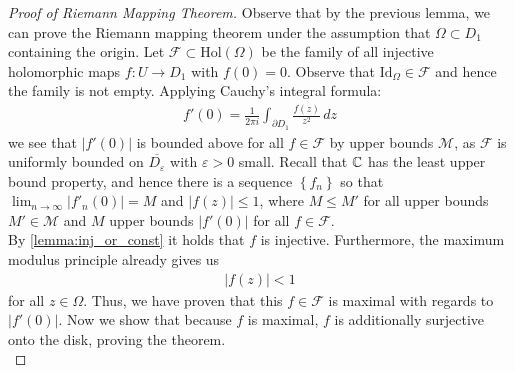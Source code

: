\documentclass{memoir}
\begin{document}
\begin{proof}[Proof of Riemann Mapping Theorem]
	Observe that by the previous lemma, we can prove the Riemann mapping theorem under the assumption that \(\Omega \subset D_1\) containing the origin. Let \(\mathcal{F}\subset \textrm{Hol}(\Omega )\) be the family of all injective holomorphic maps \(f:U\to D_1\) with \(f(0) = 0\). Observe that \(\textrm{Id}_\Omega \in \mathcal{F}\) and hence the family is not empty. Applying Cauchy's integral formula:
	\begin{align*}
		f'(0) = \frac{1}{2\pi i}\int_{\partial D_1} \frac{f(z)}{z^2}\,d z
	\end{align*}
	we see that \(\left| f'(0) \right| \) is bounded above for all \(f \in \mathcal{F}\) by upper bounds \(\mathcal{M}\), as \(\mathcal{F}\) is uniformly bounded on \(\overline{D_\varepsilon}\) with \(\varepsilon>0\) small. Recall that \(\mathbb{C}\) has the least upper bound property, and hence there is a sequence \(\left\{ f_n \right\} \) so that \(\lim_{n \to \infty} \left| f'_n(0) \right| = M\) and \(\left| f(z) \right| \leq 1\), where \(M\leq M'\) for all upper bounds \(M' \in \mathcal{M}\) and \(M\) upper bounds \(\left| f'(0) \right| \) for all \(f \in \mathcal{F}\).\\

	By \ref{lemma:inj_or_const} it holds that \(f\) is injective. Furthermore, the maximum modulus principle already gives us
	\begin{align*}
		\left| f(z) \right| <1
	\end{align*}
	for all \(z \in \Omega \). Thus, we have proven that this \(f \in \mathcal{F}\) is maximal with regards to \(\left| f'(0) \right| \). Now we show that because \(f\) is maximal, \(f\) is additionally surjective onto the disk, proving the theorem.\\


\end{proof}
\end{document}
